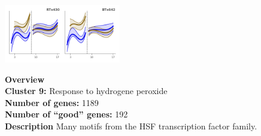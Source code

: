 \begin{multicols}{2}
\includegraphics[width=2in]{figures/clusters/leaf_Preflowering_8.png}
\columnbreak

\noindent \textbf{Overview}\\\textbf{Cluster 9:} Response to hydrogene peroxide \\
\textbf{Number of genes:} 1189 \\
\textbf{Number of ``good'' genes:} 192 \\
\textbf{Description} Many motifs from the HSF transcription factor family. \\
\end{multicols}

